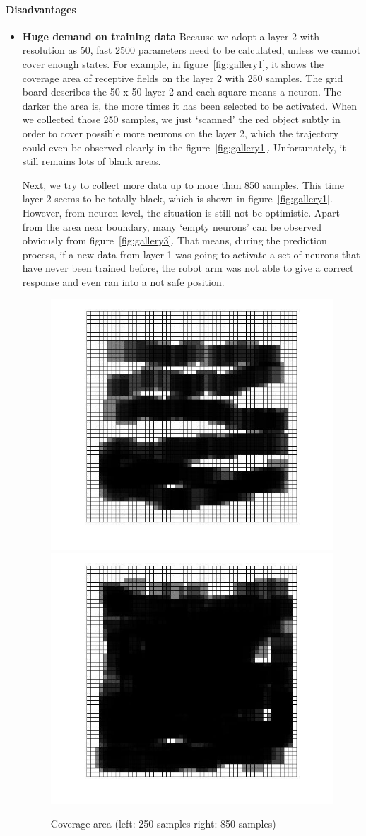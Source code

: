 \documentclass[
11pt, %
a4paper, %
oneside, %
headinclude%
BCOR3mm, %
]{scrartcl}
\begin{document}
\paragraph{Disadvantages}
\begin{itemize}[noitemsep]
\item \textbf{Huge demand on training data}
Because we adopt a layer 2 with resolution as 50, fast 2500 parameters need to be calculated, 
unless we cannot cover enough states. For example, in figure~\vref{fig:gallery1}, 
it shows the coverage area of receptive fields on the layer 2 with 250 samples. 
The grid board describes the 50 x 50 layer 2 and each square means a neuron.
The darker the area is, the more times it has been selected to be activated. 
When we collected those 250 samples, 
we just ‘scanned’ the red object subtly in order to cover possible more neurons on the layer 2, 
which the trajectory could even be observed clearly in the figure~\vref{fig:gallery1}. 
Unfortunately, it still remains lots of blank areas.

 
Next, we try to collect more data up to more than 850 samples. This time layer 2 seems to be totally black, 
which is shown in figure~\vref{fig:gallery1}. 
However, from neuron level, the situation is still not be optimistic. 
Apart from the area near boundary, many ‘empty neurons’ can be observed obviously from figure~\vref{fig:gallery3}. 
That means, during the prediction process, if a new data from layer 1 was going to activate a set of neurons that have never been trained before, 
the robot arm was not able to give a correct response and even ran into a not safe position.
\begin{figure}[tb]
\centering 
\includegraphics[width=0.45\columnwidth]{receptivefield250}
\includegraphics[width=0.45\columnwidth]{receptivefield} 
\caption[An example of a floating figure]{Coverage area (left: 250 samples right: 850 samples)} %
\label{fig:gallery1} 
\end{figure}


\end{itemize}
\end{document}
